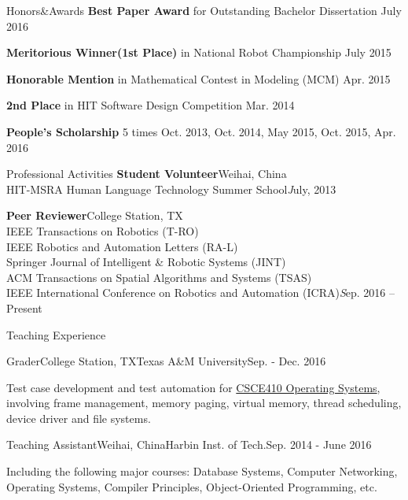 \documentclass{resume} %
\begin{document}
\begin{rSection}{Honors\&Awards}
{\bf Best Paper Award}{ for Outstanding Bachelor Dissertation} \hfill {July 2016}
\vspace*{-0.4em}

{\bf Meritorious Winner(1st Place)}{ in National Robot Championship} \hfill {July 2015}
\vspace*{-0.4em}

{\bf Honorable Mention}{ in Mathematical Contest in Modeling (MCM)} \hfill {Apr. 2015}
\vspace*{-0.4em}

{\bf 2nd Place}{ in HIT Software Design Competition} \hfill {Mar. 2014} 
\vspace*{-0.4em}

{\bf People's Scholarship} 5 times \hfill {Oct. 2013, Oct. 2014, May 2015, Oct. 2015, Apr. 2016}
\vspace*{-0.4em}

\end{rSection}

\begin{rSection}{Professional Activities}
{\bf Student Volunteer}\hfill Weihai, China\\
HIT-MSRA Human Language Technology Summer School\hfill {\emph July, 2013}
\vspace*{-0.2em}

{\bf Peer Reviewer}\hfill College Station, TX\\
IEEE Transactions on Robotics (T-RO)\\
IEEE Robotics and Automation Letters (RA-L)\\
Springer Journal of Intelligent \& Robotic Systems (JINT)\\
ACM Transactions on Spatial Algorithms and Systems (TSAS)\\
IEEE International Conference on Robotics and Automation (ICRA)\hfill {\emph Sep. 2016 -- Present}
\end{rSection}

\begin{rSection}{Teaching Experience}
\begin{rSubsection}{Grader}{College Station, TX}{Texas A\&M University}{Sep. - Dec. 2016}
\item Test case development and test automation for \href{http://faculty.cse.tamu.edu/dilma/web-csce410-fall16/index.htm}{CSCE410 Operating Systems}, involving frame management, memory paging, virtual memory, thread scheduling, device driver and file systems.
\end{rSubsection}

\begin{rSubsection}{Teaching Assistant}{Weihai, China}{Harbin Inst. of Tech.}{Sep. 2014 - June 2016}
\item Including the following major courses: Database Systems, Computer Networking, Operating Systems, Compiler Principles, Object-Oriented Programming, etc.
\end{rSubsection}
\end{rSection}
\end{document}
